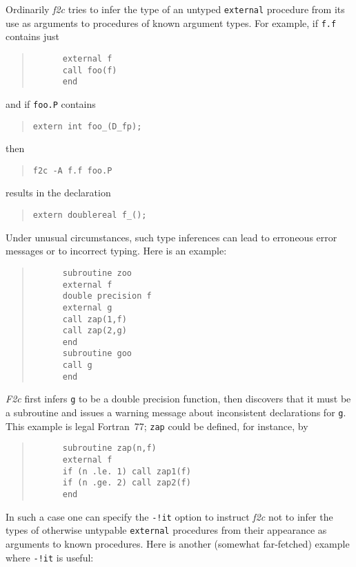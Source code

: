 \documentclass[10pt,a4paper]{article}
\begin{document}
Ordinarily \emph{f2c} tries to infer the type of an untyped \verb|external| procedure from its use as arguments to procedures of known argument types. For example, if \verb|f.f| contains just
\begin{quote}
\begin{verbatim}
      external f
      call foo(f)
      end
\end{verbatim}
\end{quote}
and if \verb|foo.P| contains
\begin{quote}
\begin{verbatim}
extern int foo_(D_fp);
\end{verbatim}
\end{quote}
then
\begin{quote}
\begin{verbatim}
f2c -A f.f foo.P
\end{verbatim}
\end{quote}
results in the declaration
\begin{quote}
\begin{verbatim}
extern doublereal f_();
\end{verbatim}
\end{quote}
Under unusual circumstances, such type inferences can lead to erroneous error messages or to incorrect typing. Here is an example:
\begin{quote}
\begin{verbatim}
      subroutine zoo
      external f
      double precision f
      external g
      call zap(1,f)
      call zap(2,g)
      end
      subroutine goo
      call g
      end
\end{verbatim}
\end{quote}
\emph{F2c} first infers \verb|g| to be a double precision function, then discovers that it must be a subroutine and issues a warning message about inconsistent declarations for \verb|g|. This example is legal Fortran~77; \verb|zap| could be defined, for instance, by
\begin{quote}
\begin{verbatim}
      subroutine zap(n,f)
      external f
      if (n .le. 1) call zap1(f)
      if (n .ge. 2) call zap2(f)
      end
\end{verbatim}
\end{quote}
In such a case one can specify the \verb|-!it| option to instruct \emph{f2c} not to infer the types of otherwise untypable \verb|external| procedures from their appearance as arguments to known procedures. Here is another (somewhat far-fetched) example where \verb|-!it| is useful:
\end{document}
